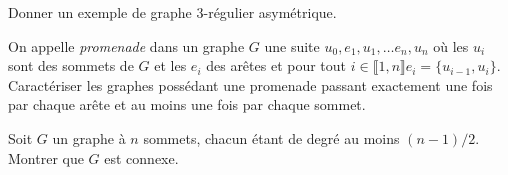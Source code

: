 \documentclass[french]{report}
\begin{document}
\begin{exo}
    Donner un exemple de graphe \(3\)-régulier asymétrique.
\end{exo}

\begin{exo}
    On appelle \textit{promenade} dans un graphe \(G\) une suite \(u_0, e_1, u_1,\dots
    e_n,u_n\) où les \(u_i\) sont des sommets de \(G\) et les \(e_i\) des arêtes et
    pour tout \(i\in\llbracket1,n\rrbracket e_i=\{u_{i-1},u_i\}\). Caractériser les
    graphes possédant une promenade passant exactement une fois par chaque arête et
    au moins une fois par chaque sommet.
\end{exo}

\begin{exo}
    Soit \(G\) un graphe à \(n\) sommets, chacun étant de degré au moins
    \(\left(n-1\right)/2\). Montrer que \(G\) est connexe.
\end{exo}
\end{document}
